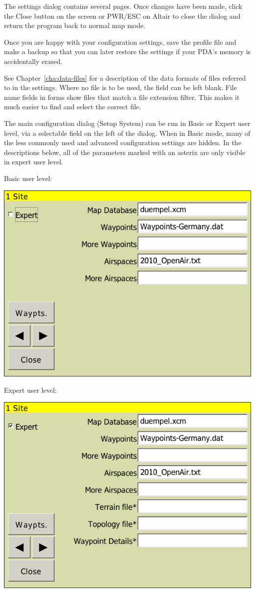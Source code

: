 \documentclass[a4paper,12pt]{refrep}
\begin{document}
The settings dialog contains several pages.  Once changes have been made,
click the Close button on the screen or PWR/ESC on Altair to close the dialog
and return the program back to normal map mode.

\tip Once you are happy with your configuration settings, save the
profile file and make a backup so that you can later restore the
settings if your PDA's memory is accidentally erased.

See Chapter~\ref{cha:data-files} for a description of the data formats
of files referred to in the settings.  Where no file is to be used,
the field can be left blank.  File name fields in forms show files
that match a file extension filter.  This makes it much easier to find
and select the correct file.

The main configuration dialog (Setup System) can be run in Basic or
Expert user level, via a selectable field on the left of the dialog.
When in Basic mode, many of the less commonly used and advanced
configuration settings are hidden.  In the descriptions below,
all of the parameters marked with an asterix are only visible in
expert user level.

Basic user level:
\begin{center}
\includegraphics[angle=0,width=0.8\linewidth,keepaspectratio='true']{figures/config-basic.png}
\end{center}

Expert user level:
\begin{center}
\includegraphics[angle=0,width=0.8\linewidth,keepaspectratio='true']{figures/config-expert.png}
\end{center}
\end{document}
